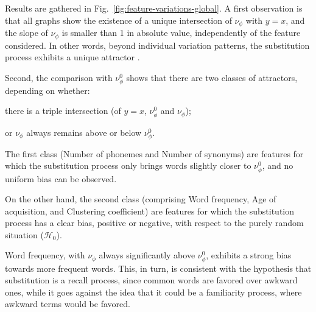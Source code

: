 Results are gathered in Fig.~\ref{fig:feature-variations-global}.
A first observation is that all graphs show the existence of a unique intersection of $\nu_{\phi}$ with $y=x$, and the slope of $\nu_{\phi}$ is smaller than 1 in absolute value, independently of the feature considered.
In other words, beyond individual variation patterns, the substitution process exhibits a unique attractor .

Second, the comparison with $\nu_{\phi}^0$ shows that there are two classes of attractors, depending on whether:
\begin{APAenumerate}
\item there is a triple intersection (of $y=x$, $\nu_{\phi}^0$ and $\nu_{\phi}$);
\item or $\nu_{\phi}$ always remains above or below $\nu_{\phi}^0$.
\end{APAenumerate}
The first class (Number of phonemes and Number of synonyms) are features for which the substitution process only brings words slightly closer to $\nu_{\phi}^0$, and no uniform bias can be observed.



On the other hand, the second class (comprising Word frequency, Age of acquisition, and Clustering coefficient) are features for which the substitution process has a clear bias, positive or negative, with respect to the purely random situation ($\mathcal{H}_0$).

Word frequency, with $\nu_{\phi}$ always significantly above $\nu_{\phi}^0$, exhibits a strong bias towards more frequent words. This, in turn, is consistent with the hypothesis that substitution is a recall process, since common words are favored over awkward ones, while it goes against the idea that it could be a familiarity process, where awkward terms would be favored.

